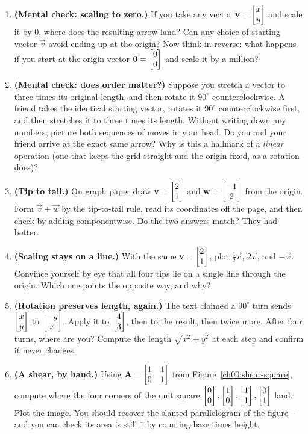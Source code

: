 \begin{enumerate}
\item \textbf{(Mental check: scaling to zero.)} If you take any vector $\mathbf{v} = \begin{bmatrix}x \\ y\end{bmatrix}$ and scale it by $0$, where does the resulting arrow land? Can any choice of starting vector $\vec{v}$ avoid ending up at the origin? Now think in reverse: what happens if you start at the origin vector $\mathbf{0} = \begin{bmatrix}0 \\ 0\end{bmatrix}$ and scale it by a million?

\item \textbf{(Mental check: does order matter?)} Suppose you stretch a vector to three times its original length, and then rotate it $90^\circ$ counterclockwise. A friend takes the identical starting vector, rotates it $90^\circ$ counterclockwise first, and then stretches it to three times its length. Without writing down any numbers, picture both sequences of moves in your head. Do you and your friend arrive at the exact same arrow? Why is this a hallmark of a \emph{linear} operation (one that keeps the grid straight and the origin fixed, as a rotation does)?

\item \textbf{(Tip to tail.)} On graph paper draw $\mathbf{v}=\begin{bmatrix}2\\1\end{bmatrix}$ and
$\mathbf{w}=\begin{bmatrix}-1\\2\end{bmatrix}$ from the origin. Form $\vec{v}+\vec{w}$ by the tip-to-tail
rule, read its coordinates off the page, and then check by adding componentwise.
Do the two answers match? They had better.

\item \textbf{(Scaling stays on a line.)} With the same $\mathbf{v}=\begin{bmatrix}2\\1\end{bmatrix}$,
plot $\tfrac{1}{2}\vec{v}$, $2\vec{v}$, and $-\vec{v}$. Convince yourself by eye
that all four tips lie on a single line through the origin. Which one points the
opposite way, and why?

\item \textbf{(Rotation preserves length, again.)} The text claimed a $90^\circ$
turn sends $\begin{bmatrix}x\\y\end{bmatrix}$ to $\begin{bmatrix}-y\\x\end{bmatrix}$. Apply it to $\begin{bmatrix}4\\3\end{bmatrix}$, then
to the result, then twice more. After four turns, where are you? Compute the
length $\sqrt{x^2+y^2}$ at each step and confirm it never changes.

\item \textbf{(A shear, by hand.)} Using $\mathbf{A}=\begin{bmatrix}1 & 1 \\ 0 & 1\end{bmatrix}$ from
Figure~\ref{ch00:shear-square}, compute where the four corners of the unit square
$\begin{bmatrix}0\\0\end{bmatrix},\begin{bmatrix}1\\0\end{bmatrix},\begin{bmatrix}1\\1\end{bmatrix},\begin{bmatrix}0\\1\end{bmatrix}$ land. Plot the image.
You should recover the slanted parallelogram of the figure -- and you can check
its area is still $1$ by counting base times height.


\end{enumerate}
